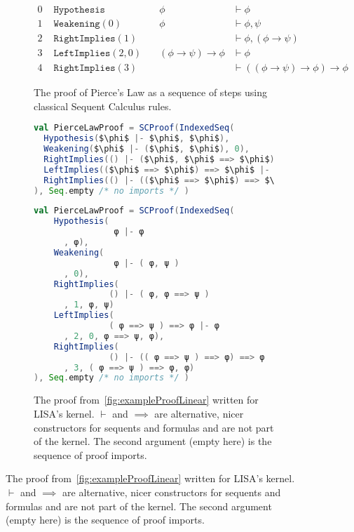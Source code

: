 \begin{figure}[ht]
  \centering
  \begin{subfigure}{\linewidth}
    \begin{align*}
        0 &\texttt { Hypothesis} &\quad \phi &\vdash \phi\\
        1 &\texttt { Weakening}(0) &\quad  \phi &\vdash \phi, \psi\\
        2 &\texttt { RightImplies}(1) &\quad  &\vdash \phi, (\phi \to \psi)\\
        3 &\texttt { LeftImplies}(2,0) &\quad (\phi \to \psi) \to \phi &\vdash \phi\\
        4 &\texttt { RightImplies}(3) &\quad &\vdash ((\phi \to \psi) \to \phi) \to \phi
    \end{align*}
    
    \caption{The proof of Pierce's Law as a sequence of steps using classical Sequent Calculus rules.}
    \label{fig:exampleProofLinear}
    
    \end{subfigure}
    
    
    \begin{subfigure}{\linewidth}
      \begin{lstlisting}[language=scala, showspaces=true]
val PierceLawProof = SCProof(IndexedSeq(
  Hypothesis($\phi$ |- $\phi$, $\phi$),
  Weakening($\phi$ |- ($\phi$, $\phi$), 0),
  RightImplies(() |- ($\phi$, $\phi$ ==> $\phi$), 1, $\phi$, $\phi$)
  LeftImplies(($\phi$ ==> $\phi$) ==> $\phi$ |- $\phi$, 2, 0, $\phi$ ==> $\phi$, $\phi$),
  RightImplies(() |- (($\phi$ ==> $\phi$) ==> $\phi$) ==> $\phi$, 3, ($\phi$ ==> $\phi$) ==> $\phi$, $\phi$)
), Seq.empty /* no imports */ )
  \end{lstlisting}
        \begin{lstlisting}[language=scala, showspaces=true]
val PierceLawProof = SCProof(IndexedSeq(
    Hypothesis( 
                φ |- φ
      , φ),
    Weakening( 
                φ |- ( φ, ψ )
      , 0),
    RightImplies(
               () |- ( φ, φ ==> ψ )
      , 1, φ, ψ)
    LeftImplies(
               ( φ ==> ψ ) ==> φ |- φ
      , 2, 0, φ ==> ψ, φ),
    RightImplies(
               () |- (( φ ==> ψ ) ==> φ) ==> φ
      , 3, ( φ ==> ψ ) ==> φ, φ)
), Seq.empty /* no imports */ )
    \end{lstlisting}
        \caption{The proof from~\autoref{fig:exampleProofLinear} written for LISA's kernel. $\vdash$ and $\implies$ are alternative, nicer constructors for sequents and formulas and are not part of the kernel. The second argument (empty here) is the sequence of proof imports.}
        \label{fig:ExampleProofLinearScala}
    \end{subfigure}
\end{figure}

